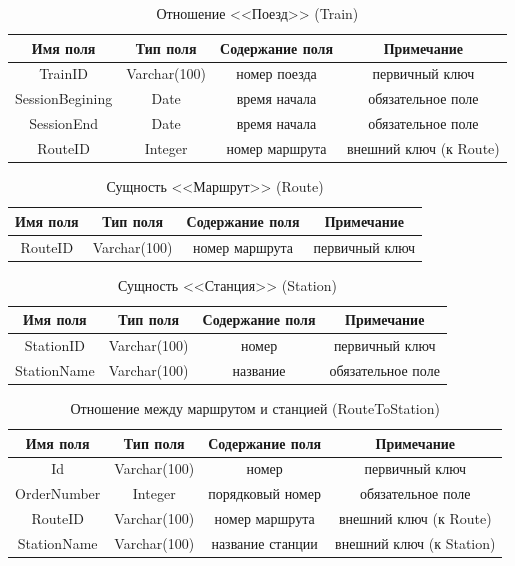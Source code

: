 \documentclass[a4paper,10pt]{article}
\theoremstyle{plain} %
\theoremstyle{definition} %
\theoremstyle{remark} %
\theoremstyle{definition}
\begin{document}
\begin{table}[h!]
\centering
\begin{tabular}{|c|c|c|c|}
    \hline
    Имя поля & Тип поля & Содержание поля & Примечание \\
    \hline
    TrainID & Varchar(100) & номер поезда & первичный ключ \\
    SessionBegining & Date & время начала & обязательное поле \\
    SessionEnd & Date & время начала & обязательное поле \\
    RouteID & Integer & номер маршрута & внешний ключ (к Route) \\
    \hline
\end{tabular}
    \caption{Отношение <<Поезд>> (Train)}
\end{table}

\begin{table}[h!]
\centering
\begin{tabular}{|c|c|c|c|}
    \hline
    Имя поля & Тип поля & Содержание поля & Примечание \\
    \hline
    RouteID & Varchar(100) & номер маршрута & первичный ключ \\
    \hline
\end{tabular}
    \caption{Сущность <<Маршрут>> (Route)}
\end{table}

\begin{table}[h!]
\centering
\begin{tabular}{|c|c|c|c|}
    \hline
    Имя поля & Тип поля & Содержание поля & Примечание \\
    \hline
    StationID & Varchar(100) & номер & первичный ключ \\
    StationName & Varchar(100) & название & обязательное поле \\
    \hline
\end{tabular}
    \caption{Сущность <<Станция>> (Station)}
\end{table}

\begin{table}[h!]
\centering
\begin{tabular}{|c|c|c|c|}
    \hline
    Имя поля & Тип поля & Содержание поля & Примечание \\
    \hline
    Id & Varchar(100) & номер & первичный ключ \\
    OrderNumber & Integer & порядковый номер & обязательное поле \\
    RouteID & Varchar(100) & номер маршрута & внешний ключ (к Route)  \\
    StationName & Varchar(100) & название станции & внешний ключ (к Station) \\
    \hline
\end{tabular}
    \caption{Отношение между маршрутом и станцией (RouteToStation)}
\end{table}
\end{document}
